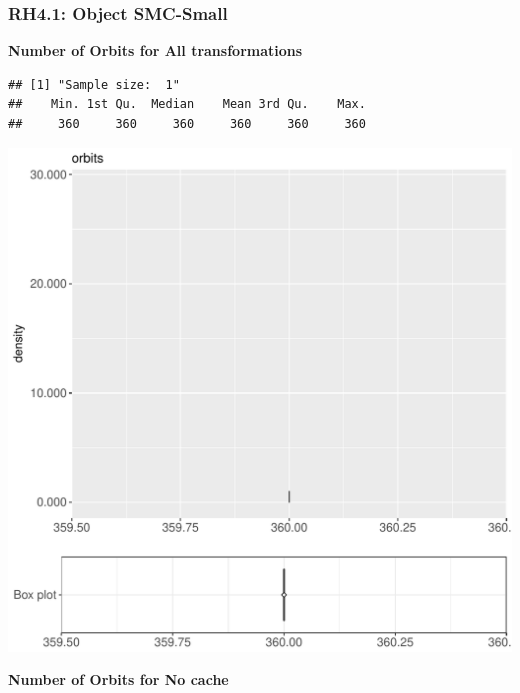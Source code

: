 \documentclass{article}\usepackage[]{graphicx}\usepackage[]{color}
\makeatletter
\def\maxwidth{ %
  \ifdim\Gin@nat@width>\linewidth
    \linewidth
  \else
    \Gin@nat@width
  \fi
}
\newenvironment{kframe}{%
 \def\at@end@of@kframe{}%
 \ifinner\ifhmode%
  \def\at@end@of@kframe{\end{minipage}}%
  \begin{minipage}{\columnwidth}%
 \fi\fi%
 \def\FrameCommand##1{\hskip\@totalleftmargin \hskip-\fboxsep
 \colorbox{shadecolor}{##1}\hskip-\fboxsep
     \hskip-\linewidth \hskip-\@totalleftmargin \hskip\columnwidth}%
 \MakeFramed {\advance\hsize-\width
   \@totalleftmargin\z@ \linewidth\hsize
   \@setminipage}}%
 {\par\unskip\endMakeFramed%
 \at@end@of@kframe}
\newenvironment{knitrout}{}{} %
\makeatother
\begin{document}
\subsubsection{RH4.1: Object SMC-Small}

 \textbf{Number of Orbits for All transformations}
\begin{knitrout}
\color{fgcolor}\begin{kframe}
\begin{verbatim}
## [1] "Sample size:  1"
##    Min. 1st Qu.  Median    Mean 3rd Qu.    Max. 
##     360     360     360     360     360     360
\end{verbatim}


{\ttfamily\noindent\bfseries{}}\end{kframe}
\includegraphics[width=\maxwidth]{figure/RH4_cashew_small-1} 

\end{knitrout}
 \textbf{Number of Orbits for No cache}
\end{document}

